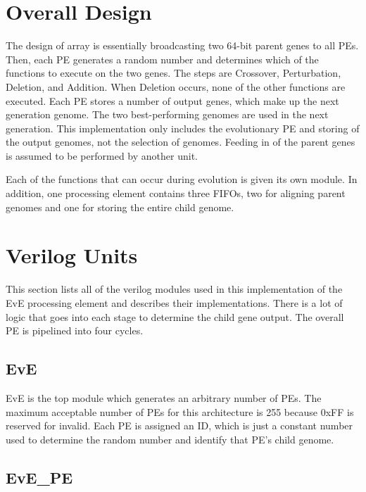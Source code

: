 \documentclass[preprint,pre,floats,aps,amsmath,amssymb]{revtex4}
\begin{document}
\section{Overall Design}

The design of array is essentially broadcasting two 64-bit parent genes to all PEs. Then, each PE generates a random number and determines which of the functions to execute on the two genes. The steps are Crossover, Perturbation, Deletion, and Addition. When Deletion occurs, none of the other functions are executed. Each PE stores a number of output genes, which make up the next generation genome. The two best-performing genomes are used in the next generation. This implementation only includes the evolutionary PE and storing of the output genomes, not the selection of genomes. Feeding in of the parent genes is assumed to be performed by another unit.

Each of the functions that can occur during evolution is given its own module. In addition, one processing element contains three FIFOs, two for aligning parent genomes and one for storing the entire child genome.



\section{Verilog Units}

This section lists all of the verilog modules used in this implementation of the EvE processing element and describes their implementations. There is a lot of logic that goes into each stage to determine the child gene output. The overall PE is pipelined into four cycles.

\subsection{EvE}

EvE is the top module which generates an arbitrary number of PEs. The maximum acceptable number of PEs for this architecture is 255 because 0xFF is reserved for invalid. Each PE is assigned an ID, which is just a constant number used to determine the random number and identify that PE’s child genome.

\subsection{EvE\_PE}
\end{document}
